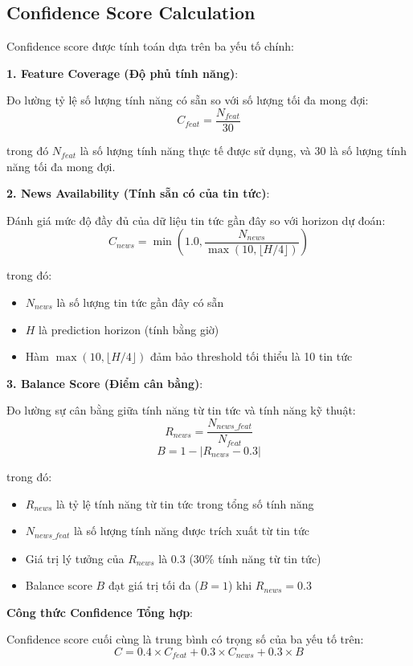 \subsection{Confidence Score Calculation}

Confidence score được tính toán dựa trên ba yếu tố chính:

\noindent\textbf{1. Feature Coverage (Độ phủ tính năng)}:

Đo lường tỷ lệ số lượng tính năng có sẵn so với số lượng tối đa mong đợi:
$$C_{feat} = \frac{N_{feat}}{30}$$

trong đó $N_{feat}$ là số lượng tính năng thực tế được sử dụng, và $30$ là số lượng tính năng tối đa mong đợi.

\noindent\textbf{2. News Availability (Tính sẵn có của tin tức)}:

Đánh giá mức độ đầy đủ của dữ liệu tin tức gần đây so với horizon dự đoán:
$$C_{news} = \min\left(1.0, \frac{N_{news}}{\max(10, \lfloor H/4 \rfloor)}\right)$$

trong đó:
\begin{itemize}
    \item $N_{news}$ là số lượng tin tức gần đây có sẵn
    \item $H$ là prediction horizon (tính bằng giờ)
    \item Hàm $\max(10, \lfloor H/4 \rfloor)$ đảm bảo threshold tối thiểu là 10 tin tức
\end{itemize}

\noindent\textbf{3. Balance Score (Điểm cân bằng)}:

Đo lường sự cân bằng giữa tính năng từ tin tức và tính năng kỹ thuật:
$$R_{news} = \frac{N_{news\_feat}}{N_{feat}}$$
$$B = 1 - |R_{news} - 0.3|$$

trong đó:
\begin{itemize}
    \item $R_{news}$ là tỷ lệ tính năng từ tin tức trong tổng số tính năng
    \item $N_{news\_feat}$ là số lượng tính năng được trích xuất từ tin tức
    \item Giá trị lý tưởng của $R_{news}$ là $0.3$ (30\% tính năng từ tin tức)
    \item Balance score $B$ đạt giá trị tối đa ($B = 1$) khi $R_{news} = 0.3$
\end{itemize}

\noindent\textbf{Công thức Confidence Tổng hợp}:

Confidence score cuối cùng là trung bình có trọng số của ba yếu tố trên:
$$C = 0.4 \times C_{feat} + 0.3 \times C_{news} + 0.3 \times B$$


